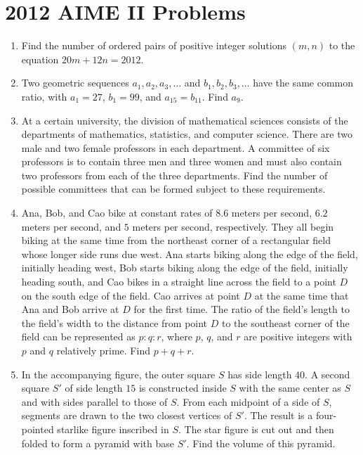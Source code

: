\documentclass{article}
\begin{document}
\newpage\section*{2012 AIME II Problems}
\begin{enumerate}[label=\arabic*., itemsep=0.5em]\item Find the number of ordered pairs of positive integer solutions \((m, n)\) to the equation \(20m + 12n = 2012\).\par \vspace{0.5em}\item Two geometric sequences \(a_1, a_2, a_3, \ldots\) and \(b_1, b_2, b_3, \ldots\) have the same common ratio, with \(a_1 = 27\), \(b_1=99\), and \(a_{15}=b_{11}\). Find \(a_9\).\par \vspace{0.5em}\item At a certain university, the division of mathematical sciences consists of the departments of mathematics, statistics, and computer science. There are two male and two female professors in each department. A committee of six professors is to contain three men and three women and must also contain two professors from each of the three departments. Find the number of possible committees that can be formed subject to these requirements.\par \vspace{0.5em}\item Ana, Bob, and Cao bike at constant rates of \(8.6\) meters per second, \(6.2\) meters per second, and \(5\) meters per second, respectively. They all begin biking at the same time from the northeast corner of a rectangular field whose longer side runs due west. Ana starts biking along the edge of the field, initially heading west, Bob starts biking along the edge of the field, initially heading south, and Cao bikes in a straight line across the field to a point \(D\) on the south edge of the field. Cao arrives at point \(D\) at the same time that Ana and Bob arrive at \(D\) for the first time. The ratio of the field's length to the field's width to the distance from point \(D\) to the southeast corner of the field can be represented as \(p : q : r\), where \(p\), \(q\), and \(r\) are positive integers with \(p\) and \(q\) relatively prime. Find \(p+q+r\).\par \vspace{0.5em}\item In the accompanying figure, the outer square \(S\) has side length \(40\). A second square \(S'\) of side length \(15\) is constructed inside \(S\) with the same center as \(S\) and with sides parallel to those of \(S\). From each midpoint of a side of \(S\), segments are drawn to the two closest vertices of \(S'\). The result is a four-pointed starlike figure inscribed in \(S\). The star figure is cut out and then folded to form a pyramid with base \(S'\). Find the volume of this pyramid.


\end{enumerate}
\end{document}
